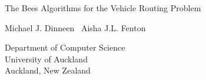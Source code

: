 

\pagestyle{empty}

\LARGE
\begin{flushleft}
The Bees Algorithms for the Vehicle Routing Problem
\end{flushleft}

\normalsize
\begin{flushleft}
Michael J. Dinneen \ Aisha J.L. Fenton
\end{flushleft}

\vfill
\rmfamily
\begin{flushright}
Department of Computer Science\\
University of Auckland \\
Auckland, New Zealand 
\end{flushright}

\cleardoublepage